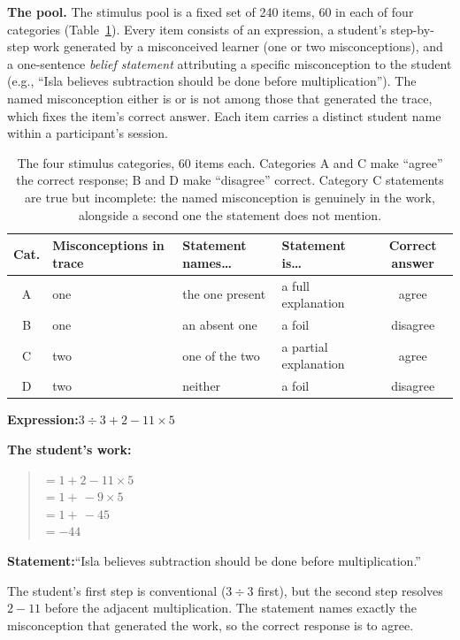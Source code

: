 \documentclass[11pt]{article}
\begin{document}
\smallskip
\textbf{The pool.} The stimulus pool is a fixed set of 240 items, 60 in each of four categories
(Table~\ref{tab:categories}). Every item consists of an expression, a student's step-by-step
work generated by a misconceived learner (one or two misconceptions), and a one-sentence
\emph{belief statement} attributing a specific misconception to the student (e.g., ``Isla
believes subtraction should be done before multiplication''). The named misconception either is
or is not among those that generated the trace, which fixes the item's correct answer. Each
item carries a distinct student name within a participant's session.

\begin{table}[!ht]
\centering
\small
\renewcommand{\arraystretch}{1.25}
\begin{tabular}{@{}clllc@{}}
\toprule
\textbf{Cat.} & \textbf{Misconceptions in trace} & \textbf{Statement names\ldots} & \textbf{Statement is\ldots} & \textbf{Correct answer}\\
\midrule
A & one & the one present & a full explanation & agree\\
B & one & an absent one & a foil & disagree\\
C & two & one of the two & a partial explanation & agree\\
D & two & neither & a foil & disagree\\
\bottomrule
\end{tabular}
\caption{The four stimulus categories, 60 items each. Categories A and C make ``agree'' the
correct response; B and D make ``disagree'' correct. Category C statements are true but
incomplete: the named misconception is genuinely in the work, alongside a second one the
statement does not mention.}
\label{tab:categories}
\end{table}

\begin{tcolorbox}[colback=black!3,colframe=black!30,boxrule=0.6pt,
  left=8pt,right=8pt,top=6pt,bottom=6pt,title={\bfseries Example item (category A, pool id A044)}]
\small
\textbf{Expression:}\quad $3 \div 3 + 2 - 11 \times 5$

\smallskip
\textbf{The student's work:}
\begin{quote}
$= 1 + 2 - 11 \times 5$\\
$= 1 + \,-9 \times 5$\\
$= 1 + \,-45$\\
$= -44$
\end{quote}
\textbf{Statement:}\quad ``Isla believes subtraction should be done before multiplication.''

\smallskip
The student's first step is conventional ($3 \div 3$ first), but the second step resolves
$2 - 11$ before the adjacent multiplication. The statement names exactly the misconception
that generated the work, so the correct response is to agree.
\end{tcolorbox}
\end{document}
